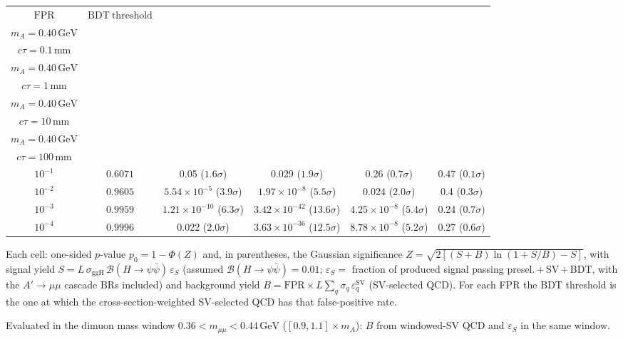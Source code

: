 \documentclass[10pt,a4paper]{article}
\begin{document}
{\begin{tabular}{cccccc}
\toprule
$\mathrm{FPR}$ & $\mathrm{BDT\ threshold}$ & \shortstack{$m_{\pi}=4\,\mathrm{GeV}$\\$m_{A}=0.40\,\mathrm{GeV}$\\$c\tau=0.1\,\mathrm{mm}$} & \shortstack{$m_{\pi}=4\,\mathrm{GeV}$\\$m_{A}=0.40\,\mathrm{GeV}$\\$c\tau=1\,\mathrm{mm}$} & \shortstack{$m_{\pi}=4\,\mathrm{GeV}$\\$m_{A}=0.40\,\mathrm{GeV}$\\$c\tau=10\,\mathrm{mm}$} & \shortstack{$m_{\pi}=4\,\mathrm{GeV}$\\$m_{A}=0.40\,\mathrm{GeV}$\\$c\tau=100\,\mathrm{mm}$} \\
\midrule
$10^{-1}$ & $0.6071$ & 0.05 ($1.6\sigma$) & 0.029 ($1.9\sigma$) & 0.26 ($0.7\sigma$) & 0.47 ($0.1\sigma$)\\
$10^{-2}$ & $0.9605$ & $5.54\times10^{-5}$ ($3.9\sigma$) & $1.97\times10^{-8}$ ($5.5\sigma$) & 0.024 ($2.0\sigma$) & 0.4 ($0.3\sigma$)\\
$10^{-3}$ & $0.9959$ & $1.21\times10^{-10}$ ($6.3\sigma$) & $3.42\times10^{-42}$ ($13.6\sigma$) & $4.25\times10^{-8}$ ($5.4\sigma$) & 0.24 ($0.7\sigma$)\\
$10^{-4}$ & $0.9996$ & 0.022 ($2.0\sigma$) & $3.63\times10^{-36}$ ($12.5\sigma$) & $8.78\times10^{-8}$ ($5.2\sigma$) & 0.27 ($0.6\sigma$)\\
\bottomrule
\end{tabular}

{\small Each cell: one-sided $p$-value $p_0=1-\Phi(Z)$ and, in parentheses, the Gaussian significance $Z=\sqrt{2\left[(S{+}B)\ln(1{+}S/B)-S\right]}$, with signal yield $S=L\,\sigma_{\mathrm{ggH}}\,\mathcal{B}(H\to\psi\bar{\psi})\,\varepsilon_S$ (assumed $\mathcal{B}(H\to\psi\bar{\psi})=0.01$; $\varepsilon_S=$ fraction of produced signal passing presel.\,$+$\,SV\,$+$\,BDT, with the $A'\to\mu\mu$ cascade BRs included) and background yield $B=\mathrm{FPR}\times L\sum_q\sigma_q\,\varepsilon_q^{\mathrm{SV}}$ (SV-selected QCD). For each FPR the BDT threshold is the one at which the cross-section-weighted SV-selected QCD has that false-positive rate.}

{\small Evaluated in the dimuon mass window $0.36<m_{\mu\mu}<0.44\,\mathrm{GeV}$ ($[0.9,1.1]\times m_A$): $B$ from windowed-SV QCD and $\varepsilon_S$ in the same window.}

}\clearpage
\end{document}
